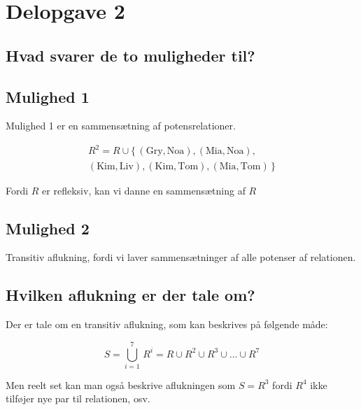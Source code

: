 \section{Delopgave 2}\label{sec:delopgave-2}

\subsection{Hvad svarer de to muligheder til?}\label{subsec:hvad-svarer-de-to-muligheder-til?}

\subsection*{Mulighed 1}

Mulighed 1 er en sammensætning af potensrelationer.

\begin{equation}
    \begin{split}
        R^2 = R \cup \{\,(\text{Gry}, \text{Noa}), (\text{Mia}, \text{Noa}), \\
        (\text{Kim}, \text{Liv}), (\text{Kim}, \text{Tom}), (\text{Mia}, \text{Tom})\,\}
    \end{split}\label{eq:equation7}
\end{equation}

Fordi \(R\) er refleksiv, kan vi danne en sammensætning af \(R\)

\subsection*{Mulighed 2}
Transitiv aflukning, fordi vi laver sammensætninger af alle potenser af relationen.

\subsection{Hvilken aflukning er der tale om?}\label{subsec:hvilken-aflukning-er-der-tale-om?}
Der er tale om en transitiv aflukning, som kan beskrives på følgende måde:

\begin{equation}
    S = \bigcup_{i=1}^{7} \, R^{i} = R \cup R^2 \cup R^3 \cup \ldots \cup R^7 \label{eq:equation6}
\end{equation}

Men reelt set kan man også beskrive aflukningen som \(S = R^{3}\) fordi \(R^4\) ikke tilføjer nye par til
relationen, osv.
